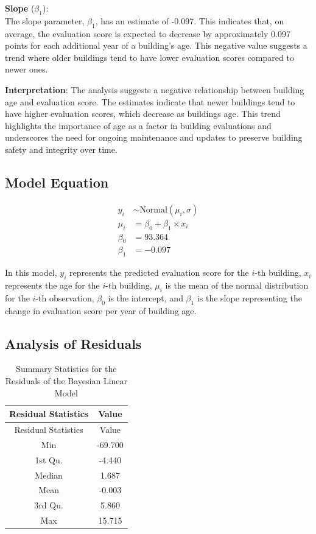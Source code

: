 \documentclass[
  letterpaper,
  DIV=11,
  numbers=noendperiod]{scrartcl}
\begin{document}
\textbf{Slope} (\(\beta_1\)):\\
The slope parameter, \(\beta_1\), has an estimate of -0.097. This
indicates that, on average, the evaluation score is expected to decrease
by approximately 0.097 points for each additional year of a building's
age. This negative value suggests a trend where older buildings tend to
have lower evaluation scores compared to newer ones.

\textbf{Interpretation}: The analysis suggests a negative relationship
between building age and evaluation score. The estimates indicate that
newer buildings tend to have higher evaluation scores, which decrease as
buildings age. This trend highlights the importance of age as a factor
in building evaluations and underscores the need for ongoing maintenance
and updates to preserve building safety and integrity over time.

\hypertarget{model-equation}{%
\subsection{Model Equation}\label{model-equation}}

\begin{align}
y_i &\sim \mbox{Normal}(\mu_i, \sigma) \\
\mu_i &= \beta_0 + \beta_1 \times x_i \\
\beta_0 &= 93.364 \\
\beta_1 &= -0.097
\end{align}

In this model, \(y_i\) represents the predicted evaluation score for the
\(i\)-th building, \(x_i\) represents the age for the \(i\)-th building,
\(\mu_i\) is the mean of the normal distribution for the \(i\)-th
observation, \(\beta_0\) is the intercept, and \(\beta_1\) is the slope
representing the change in evaluation score per year of building age.

\hypertarget{analysis-of-residuals}{%
\subsection{Analysis of Residuals}\label{analysis-of-residuals}}

\hypertarget{tbl-residuals-summary}{}
\begin{longtable}[]{@{}cc@{}}
\caption{\label{tbl-residuals-summary}Summary Statistics for the
Residuals of the Bayesian Linear Model}\tabularnewline
\toprule\noalign{}
Residual Statistics & Value \\
\midrule\noalign{}
\endfirsthead
\toprule\noalign{}
Residual Statistics & Value \\
\midrule\noalign{}
\endhead
\bottomrule\noalign{}
\endlastfoot
Min & -69.700 \\
1st Qu. & -4.440 \\
Median & 1.687 \\
Mean & -0.003 \\
3rd Qu. & 5.860 \\
Max & 15.715 \\
\end{longtable}
\end{document}
